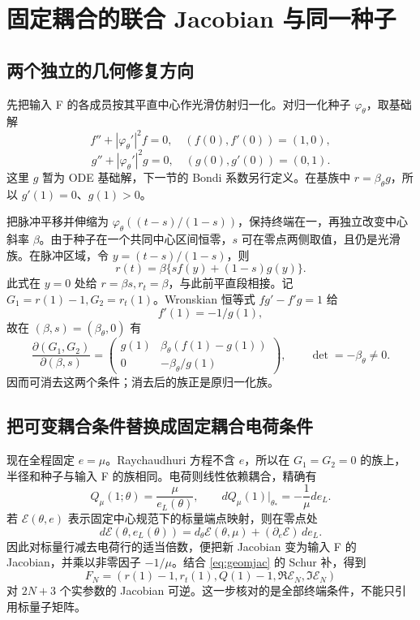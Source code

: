 \section{固定耦合的联合 Jacobian 与同一种子}

\subsection{两个独立的几何修复方向}
先把输入 F 的各成员按其平直中心作光滑仿射归一化。对归一化种子 $\varphi_\theta$，取基础解
\[
f''+|\varphi_\theta'|^2f=0,\quad (f(0),f'(0))=(1,0),
\]
\[
g''+|\varphi_\theta'|^2g=0,\quad (g(0),g'(0))=(0,1).
\]
这里 $g$ 暂为 ODE 基础解，下一节的 Bondi 系数另行定义。在基族中 $r=\beta_\theta g$，所以 $g'(1)=0$、$g(1)>0$。

把脉冲平移并伸缩为 $\varphi_\theta((t-s)/(1-s))$，保持终端在一，再独立改变中心斜率 $\beta$。由于种子在一个共同中心区间恒零，$s$ 可在零点两侧取值，且仍是光滑族。在脉冲区域，令 $y=(t-s)/(1-s)$，则
\[
r(t)=\beta\{s f(y)+(1-s)g(y)\}.
\]
此式在 $y=0$ 处给 $r=\beta s,r_t=\beta$，与此前平直段相接。记 $G_1=r(1)-1,G_2=r_t(1)$。Wronskian 恒等式 $fg'-f'g=1$ 给
\[
f'(1)=-1/g(1),
\]
故在 $(\beta,s)=(\beta_\theta,0)$ 有
\begin{equation}\label{eq:geomjac}
\frac{\partial(G_1,G_2)}{\partial(\beta,s)}
=\begin{pmatrix}
g(1)&\beta_\theta(f(1)-g(1))\\
0&-\beta_\theta/g(1)
\end{pmatrix},\qquad \det=-\beta_\theta\ne0.
\end{equation}
因而可消去这两个条件；消去后的族正是原归一化族。

\subsection{把可变耦合条件替换成固定耦合电荷条件}
现在全程固定 $e=\mu$。Raychaudhuri 方程不含 $e$，所以在 $G_1=G_2=0$ 的族上，半径和种子与输入 F 的族相同。电荷则线性依赖耦合，精确有
\begin{equation}\label{eq:chargejac}
Q_\mu(1;\theta)=\frac{\mu}{e_L(\theta)},\qquad
dQ_\mu(1)|_{\theta_*}=-\frac1\mu de_L.
\end{equation}
若 $\mathcal E(\theta,e)$ 表示固定中心规范下的标量端点映射，则在零点处
\[
d\mathcal E(\theta,e_L(\theta))
=d_\theta\mathcal E(\theta,\mu)+(\partial_e\mathcal E)\,de_L.
\]
因此对标量行减去电荷行的适当倍数，便把新 Jacobian 变为输入 F 的 Jacobian，并乘以非零因子 $-1/\mu$。结合 \eqref{eq:geomjac} 的 Schur 补，得到
\begin{equation}\label{eq:joint}
F_N=(r(1)-1,r_t(1),Q(1)-1,\Re\mathcal E_N,\Im\mathcal E_N)
\end{equation}
对 $2N+3$ 个实参数的 Jacobian 可逆。这一步核对的是全部终端条件，不能只引用标量子矩阵。

